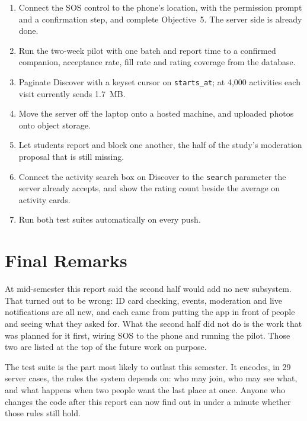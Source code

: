 \documentclass{tietreport}
\begin{document}
\begin{enumerate}
  \item Connect the SOS control to the phone's location, with the permission prompt and a
        confirmation step, and complete Objective~5. The server side is already done.
  \item Run the two-week pilot with one batch and report time to a confirmed companion,
        acceptance rate, fill rate and rating coverage from the database.
  \item Paginate Discover with a keyset cursor on \texttt{starts\_at}; at 4{,}000 activities
        each visit currently sends 1.7~MB.
  \item Move the server off the laptop onto a hosted machine, and uploaded photos onto object
        storage.
  \item Let students report and block one another, the half of the study's moderation
        proposal that is still missing.
  \item Connect the activity search box on Discover to the \texttt{search} parameter the
        server already accepts, and show the rating count beside the average on activity cards.
  \item Run both test suites automatically on every push.
\end{enumerate}

\section{Final Remarks}

At mid-semester this report said the second half would add no new subsystem. That turned out
to be wrong: ID card checking, events, moderation and live notifications are all new, and each
came from putting the app in front of people and seeing what they asked for. What the second
half did not do is the work that was planned for it first, wiring SOS to the phone and running
the pilot. Those two are listed at the top of the future work on purpose.

The test suite is the part most likely to outlast this semester. It encodes, in 29 server
cases, the rules the system depends on: who may join, who may see what, and what happens when
two people want the last place at once. Anyone who changes the code after this report can now
find out in under a minute whether those rules still hold.






\printbibliography[heading=bibintoc]
\end{document}

